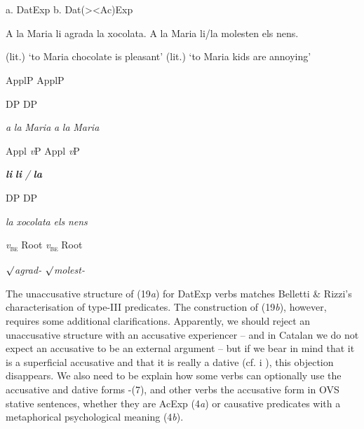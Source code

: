 \documentclass[output=paper,modfonts,nonflat]{langsci/langscibook}
\begin{document}
\ea%
    \label{ex:key:19}
    \gll\\
        \\
    \glt
    \z

         a. DatExp                                                b. Dat(>{\textbar}<Ac)Exp

           A la Maria li agrada la xocolata.             A la Maria li/la molesten els nens.

  (lit.) ‘to Maria chocolate is pleasant’      (lit.) ‘to Maria kids are annoying’

ApplP          ApplP

   DP             DP

\textit{a} \textit{la} \textit{Maria}        \textit{a} \textit{la} \textit{Maria}

Appl     \textit{v}P      Appl     \textit{v}P

     \textbf{\textit{li}}          \textbf{\textit{li}} \textit{/} \textbf{\textit{la}}

     DP           DP

      \textit{la} \textit{xocolata}                  \textit{els} \textit{nens}

      \textit{v}\textsc{\textsubscript{be}}           Root       \textit{v}\textsc{\textsubscript{be}}           Root

      ${\surd}$\textit{agrad-}              ${\surd}$\textit{molest-}

The unaccusative structure of (19\textit{a}) for DatExp verbs matches Belletti \& Rizzi’s characterisation of type-III predicates. The construction of (19\textit{b}), however, requires some additional clarifications. Apparently, we should reject an unaccusative structure with an accusative experiencer – and in Catalan we do not expect an accusative to be an external argument – but if we bear in mind that it is a superficial accusative and that it is really a dative (cf.  i ), this objection disappears. We also need to be explain how some verbs can optionally use the accusative and dative forms -(7), and other verbs the accusative form in OVS stative sentences, whether they are AcExp (4\textit{a}) or causative predicates with a metaphorical psychological meaning (4\textit{b}).
\end{document}
